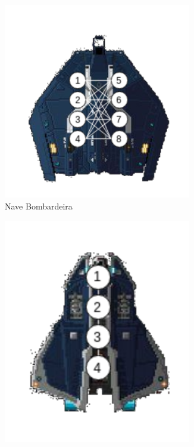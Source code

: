 \begin{figure}[ht]
	\centering
	\begin{subfigure}[b]{0.24\textwidth}
		\centering
		\includegraphics[width=0.9\textwidth]{imgs/bomb.png}
		\caption{Nave Bombardeira}
		\label{fig:nave_bomb}
	\end{subfigure}
	\begin{subfigure}[b]{0.24\textwidth}
		\centering
		\includegraphics[width=0.9\textwidth]{imgs/rec.png}

\end{subfigure}
\end{figure}

